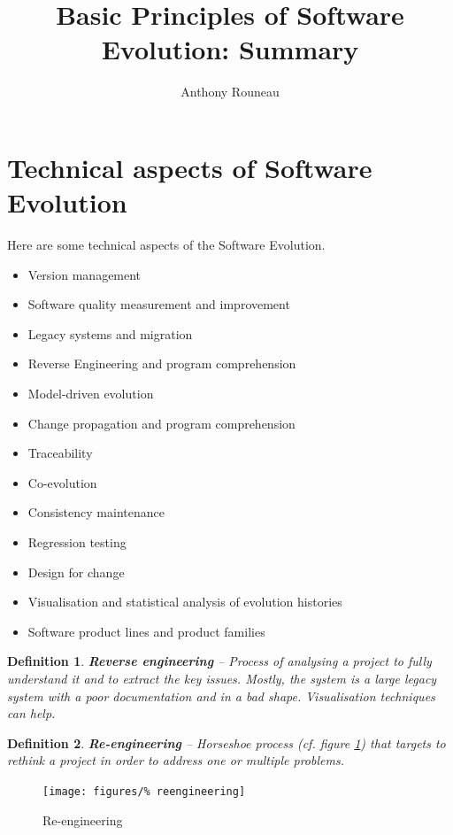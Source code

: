 \documentclass[a4paper,11pt]{report}
\title{Basic Principles of Software Evolution: Summary}
\author{Anthony Rouneau}
\newtheorem{definition}{Definition}
\begin{document}
\maketitle
\newpage
%
\section{Technical aspects of Software Evolution}
	Here are some technical aspects of the
		Software Evolution.
	\begin{itemize}
		\setlength{\itemsep}{0pt}		
		\setlength{\parskip}{0pt}		
		\setlength{\parsep}{0pt}	
		\item Version management
		\item Software quality measurement
			and improvement
		\item Legacy systems and migration
		\item Reverse Engineering and program
			comprehension
		\item Model-driven evolution
		\item Change propagation and program
			comprehension
		\item Traceability
		\item Co-evolution
		\item Consistency maintenance
		\item Regression testing
		\item Design for change
		\item Visualisation and statistical
			analysis of evolution histories
		\item Software product lines and 
			product families
	\end{itemize}
	\begin{definition}
		\textbf{Reverse engineering} --
			Process of analysing a project to fully
			understand it and to extract the key
			issues. Mostly, the system is a 
			large legacy system with a poor
			 documentation and in a bad shape.
			 Visualisation techniques can help.
	\end{definition}
	\begin{definition}
		\textbf{Re-engineering} -- 
			Horseshoe process (cf. figure
			\ref{fig:reengineering}) that targets
			to rethink a project in order to
			address one or multiple problems.
	\end{definition}
	\begin{figure}[H]
		\centering
		\texttt{[image: figures/\%
		reengineering]}
		\caption{Re-engineering}%
		\label{fig:reengineering}
	\end{figure}\noindent
\end{document}
